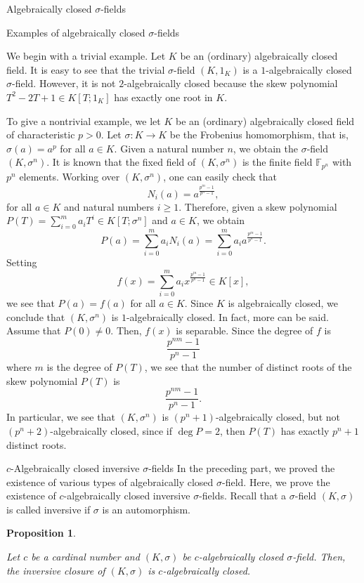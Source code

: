 \documentclass[11pt,a4paper]{article}
\theoremstyle{theorem}
\newtheorem{proposition}[theorem]{Proposition}
\numberwithin{equation}{section}
\newcommand{\s}{\sigma}
\begin{document}
\begin{section}{Algebraically closed $\s$-fields}
\begin{subsection}{Examples of algebraically closed $\s$-fields} 
	
	We begin with a trivial example. Let $K$ be an (ordinary) algebraically closed field. It is easy to see that the trivial $\s$-field $(K,1_K)$ is a $1$-algebraically closed $\s$-field. However, it is not $2$-algebraically closed because the skew polynomial $T^2-2T+1\in K[T;1_K]$ has  exactly one root in $K$.
	
	To give a nontrivial example, we let $K$ be an (ordinary) algebraically closed field of characteristic $p>0$. Let $\s:K\to K$ be the Frobenius homomorphism, that is, $\s(a)=a^p$ for all $a\in K$. Given a natural number $n$, we obtain the $\s$-field $(K,\s^n)$. It is known that the fixed field of $(K,\s^n)$ is the finite field $\mathbb{F}_{p^n}$ with $p^n$ elements.  Working over $(K,\s^n)$, one can easily check that
	$$N_i(a)=a^{\frac{p^{in}-1}{p^n-1}},$$
	for all $a\in K$ and natural numbers $i\geq 1$. Therefore, given a skew polynomial $P(T)=\sum_{i=0}^ma_iT^i\in K[T;\s^n]$ and $a\in K$, we obtain
	$$P(a)=\sum_{i=0}^ma_iN_i(a)=\sum_{i=0}^ma_ia^{\frac{p^{in}-1}{p^n-1}}.$$
	Setting 
	$$f(x)=\sum_{i=0}^ma_ix^{\frac{p^{in}-1}{p^n-1}}\in K[x],$$
	we see that $P(a)=f(a)$ for all $a\in K$. Since $K$ is algebraically closed, we conclude that  $(K,\s^n)$ is $1$-algebraically closed. In fact, more can be said. Assume that $P(0)\neq 0$. Then, $f(x)$ is separable. Since the degree of $f$ is  
	$$\frac{p^{nm}-1}{p^n-1}$$
	where $m$ is the degree of $P(T)$, we see that  the number of distinct roots of the skew polynomial $P(T)$ is
	$$\frac{p^{nm}-1}{p^n-1}.$$
	In particular, we see that $(K,\s^n)$ is $(p^n+1)$-algebraically closed, but not $(p^n+2)$-algebraically closed, since if $\deg P=2$, then $P(T)$ has exactly $p^n+1$ distinct roots.  
	
	
\end{subsection}
\begin{subsection}{$c$-Algebraically closed inversive $\s$-fields} 
	In the preceding part, we proved the existence of various types of algebraically closed $\s$-field. Here, we prove the existence of $c$-algebraically closed inversive $\s$-fields. Recall that a $\s$-field   $(K,\s)$ is called inversive if $\s$ is an automorphism. 
	\begin{proposition}\label{(P)c-algebraicallyclosedinversive}
		
		Let $c$ be a cardinal number and $(K,\sigma)$ be $c$-algebraically closed $\s$-field. Then, the inversive closure of $(K,\sigma)$ is  $c$-algebraically closed.
		

\end{proposition}
\end{subsection}
\end{section}
\end{document}
